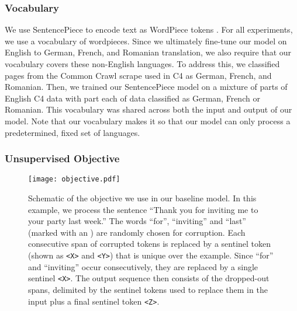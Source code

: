 \documentclass[twoside,11pt]{article}
\begin{document}
\subsubsection{Vocabulary}
We use SentencePiece \citep{kudo2018sentencepiece} to encode text as WordPiece tokens \citep{sennrich2015neural,kudo2018subword}.
For all experiments, we use a vocabulary of  wordpieces.
Since we ultimately fine-tune our model on English to German, French, and Romanian translation, we also require that our vocabulary covers these non-English languages.
To address this, we classified pages from the Common Crawl scrape used in C4 as German, French, and Romanian.
Then, we trained our SentencePiece model on a mixture of  parts of English C4 data with  part each of data classified as German, French or Romanian.
This vocabulary was shared across both the input and output of our model.
Note that our vocabulary makes it so that our model can only process a predetermined, fixed set of languages.

\subsubsection{Unsupervised Objective}
\label{sec:baseline_objective}

\begin{figure}[t]
    \centering
    \texttt{[image: objective.pdf]}
    \caption{Schematic of the objective we use in our baseline model.
    In this example, we process the sentence ``Thank you for inviting me to your party last week.''
    The words ``for'', ``inviting'' and ``last'' (marked with an ) are randomly chosen for corruption.
    Each consecutive span of corrupted tokens is replaced by a sentinel token (shown as \texttt{<X>} and \texttt{<Y>}) that is unique over the example.
    Since ``for'' and ``inviting'' occur consecutively, they are replaced by a single sentinel \texttt{<X>}.
    The output sequence then consists of the dropped-out spans, delimited by the sentinel tokens used to replace them in the input plus a final sentinel token \texttt{<Z>}.}
    \label{fig:objective}
\end{figure}
\end{document}
